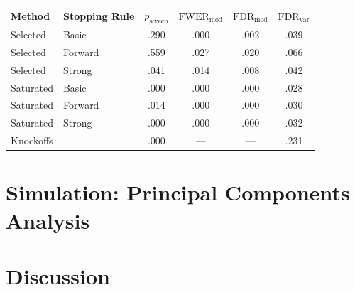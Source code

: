 \documentclass{article}
\begin{document}
\begin{table}[ht]
  \centering
  \begin{tabular}{llcccc}
    \hline
    Method & Stopping Rule & $p_{\text{screen}}$ & $\text{FWER}_{\text{mod}}$ 
    & $\text{FDR}_{\text{mod}}$ 
    & $\text{FDR}_{\text{var}}$ \\ 
    \hline
    Selected & Basic & .290 & .000 & .002 & .039 \\ 
    Selected & Forward & .559 & .027 & .020 & .066 \\ 
    Selected & Strong & .041 & .014 & .008 & .042 \\ 
    \hline
    Saturated & Basic & .000 & .000 & .000 & .028 \\ 
    Saturated & Forward & .014 & .000 & .000 & .030 \\ 
    Saturated & Strong & .000 & .000 & .000 & .032 \\ 
    \hline
    Knockoffs & & .000 & --- & --- & .231 \\ 
    \hline
  \end{tabular}
  \caption{}
\end{table}



\section{Simulation: Principal Components Analysis}\label{sec:pca}



\section{Discussion}




\end{document}
